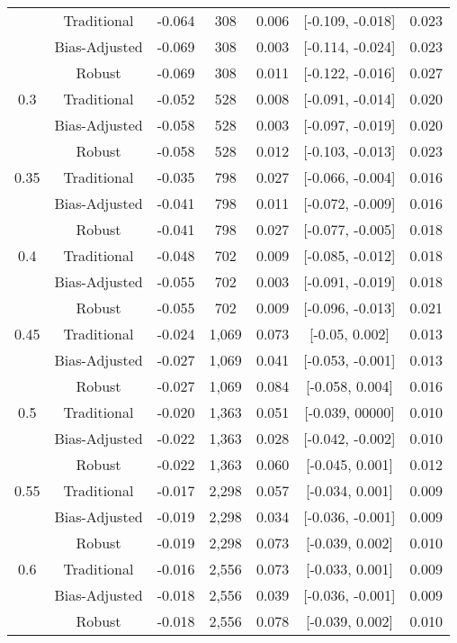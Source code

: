 \documentclass[
  12pt,
]{article}
\begin{document}
\begin{longtable}[t]{ccccccc}
\endfoot
\bottomrule
\endlastfoot
0.25 & Traditional & -0.064 & 308 & 0.006 & {}[-0.109, -0.018] & 0.023\\
 & Bias-Adjusted & -0.069 & 308 & 0.003 & {}[-0.114, -0.024] & 0.023\\
 & Robust & -0.069 & 308 & 0.011 & {}[-0.122, -0.016] & 0.027\\
0.3 & Traditional & -0.052 & 528 & 0.008 & {}[-0.091, -0.014] & 0.020\\
 & Bias-Adjusted & -0.058 & 528 & 0.003 & {}[-0.097, -0.019] & 0.020\\
 & Robust & -0.058 & 528 & 0.012 & {}[-0.103, -0.013] & 0.023\\
0.35 & Traditional & -0.035 & 798 & 0.027 & {}[-0.066, -0.004] & 0.016\\
 & Bias-Adjusted & -0.041 & 798 & 0.011 & {}[-0.072, -0.009] & 0.016\\
 & Robust & -0.041 & 798 & 0.027 & {}[-0.077, -0.005] & 0.018\\
0.4 & Traditional & -0.048 & 702 & 0.009 & {}[-0.085, -0.012] & 0.018\\
 & Bias-Adjusted & -0.055 & 702 & 0.003 & {}[-0.091, -0.019] & 0.018\\
 & Robust & -0.055 & 702 & 0.009 & {}[-0.096, -0.013] & 0.021\\
0.45 & Traditional & -0.024 & 1,069 & 0.073 & {}[-0.05, 0.002] & 0.013\\
 & Bias-Adjusted & -0.027 & 1,069 & 0.041 & {}[-0.053, -0.001] & 0.013\\
 & Robust & -0.027 & 1,069 & 0.084 & {}[-0.058, 0.004] & 0.016\\
0.5 & Traditional & -0.020 & 1,363 & 0.051 & {}[-0.039, 00000] & 0.010\\
 & Bias-Adjusted & -0.022 & 1,363 & 0.028 & {}[-0.042, -0.002] & 0.010\\
 & Robust & -0.022 & 1,363 & 0.060 & {}[-0.045, 0.001] & 0.012\\
0.55 & Traditional & -0.017 & 2,298 & 0.057 & {}[-0.034, 0.001] & 0.009\\
 & Bias-Adjusted & -0.019 & 2,298 & 0.034 & {}[-0.036, -0.001] & 0.009\\
 & Robust & -0.019 & 2,298 & 0.073 & {}[-0.039, 0.002] & 0.010\\
0.6 & Traditional & -0.016 & 2,556 & 0.073 & {}[-0.033, 0.001] & 0.009\\
 & Bias-Adjusted & -0.018 & 2,556 & 0.039 & {}[-0.036, -0.001] & 0.009\\
 & Robust & -0.018 & 2,556 & 0.078 & {}[-0.039, 0.002] & 0.010\\

\end{longtable}
\end{document}
